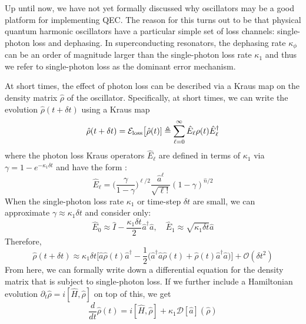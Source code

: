Up until now, we have not yet formally discussed why oscillators may be a good platform for implementing QEC. The reason for this turns out to be that physical quantum harmonic oscillators have a particular simple set of loss channels: single-photon loss and dephasing. In superconducting resonators, the dephasing rate $\kappa_\phi$ can be an order of magnitude larger than the single-photon loss rate $\kappa_1$ and thus we refer to single-photon loss as the dominant error mechanism. 

At short times, the effect of photon loss can be described via a Kraus map on the density matrix $\hat{\rho}$ of the oscillator. Specifically, at short times, we can write the evolution $\hat{\rho}(t + \delta t)$ using a Kraus map
\begin{equation}
    \hat{\rho}(t + \delta t) = \mathcal{E}_{\rm loss}\big[\hat{\rho}(t)] \triangleq \sum_{\ell = 0}^\infty  \hat{E}_\ell \rho(t)  \hat{E}_\ell^\dagger
\end{equation}
where the photon loss Kraus operators $ \hat{E}_\ell$ are defined in terms of $\kappa_1$ via $\gamma = 1 - e^{-\kappa_1 \delta t}$ and have the form \cite{albert2018performance-and-structure}:
\begin{equation}
    \hat{E}_\ell = \bigg(\frac{\gamma}{1 - \gamma}\bigg)^{\ell/2} \frac{\hat{a}^\ell}{\sqrt{\ell !}} (1 - \gamma)^{\hat{n}/2}
\end{equation}
When the single-photon loss rate $\kappa_1$ or time-step $\delta t$ are small, we can approximate $\gamma \approx \kappa_1 \delta t$ and consider only:
\begin{equation}
    \hat{E}_0 \approx \hat{I} - \frac{\kappa_1 \delta t}{2}\hat{a}^\dagger\hat{a}, \quad \hat{E}_1 \approx \sqrt{\kappa_1 \delta t}\hat{a}
\end{equation}
Therefore, 
\begin{equation}
    \hat{\rho}(t + \delta t) \approx \kappa_1\delta t\bigg[\hat{a}\hat{\rho}(t)\hat{a}^\dagger - \frac{1}{2}\Big(\hat{a}^\dagger\hat{a}\hat{\rho}(t) + \hat{\rho}(t)\hat{a}^\dagger\hat{a}\Big)\bigg] + \mathcal{O}(\delta t^2)
\end{equation}
From here, we can formally write down a differential equation for the density matrix that is subject to single-photon loss. If we further include a Hamiltonian evolution $\partial_t \hat{\rho} = i[\hat{H}, \hat{\rho}]$ on top of this, we get
\begin{equation}
    \frac{d}{dt}\hat{\rho}(t) = i[\hat{H}, \hat{\rho}] + \kappa_1\mathcal{D}[\hat{a}](\hat{\rho})
    \label{eq:2_lindblad_photon_loss}
\end{equation}
